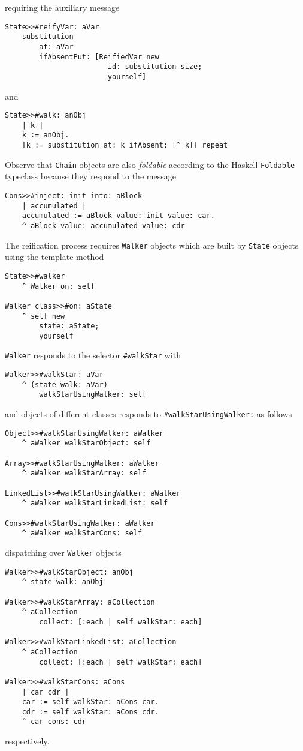 \documentclass[a4paper,11pt]{article}
\begin{document}
requiring the auxiliary message
\begin{verbatim}
State>>#reifyVar: aVar 
    substitution
        at: aVar
        ifAbsentPut: [ReifiedVar new 
                        id: substitution size; 
                        yourself]
\end{verbatim}
and
\begin{verbatim}
State>>#walk: anObj 
    | k |
    k := anObj.
    [k := substitution at: k ifAbsent: [^ k]] repeat
\end{verbatim}
Observe that \Verb|Chain| objects are also \textit{foldable} according to the Haskell \Verb|Foldable| typeclass because 
they respond to the message
\begin{verbatim}
Cons>>#inject: init into: aBlock 
    | accumulated |
    accumulated := aBlock value: init value: car.
    ^ aBlock value: accumulated value: cdr
\end{verbatim}

The reification process requires \Verb|Walker| objects which are built by
\Verb|State| objects using the template method
\begin{verbatim}
State>>#walker
    ^ Walker on: self

Walker class>>#on: aState
    ^ self new
        state: aState;
        yourself
\end{verbatim}
\Verb|Walker| responds to the selector \Verb|#walkStar| with
\begin{verbatim}
Walker>>#walkStar: aVar
    ^ (state walk: aVar)
        walkStarUsingWalker: self
\end{verbatim}
and objects of different classes responds to \Verb|#walkStarUsingWalker:| as follows
\begin{verbatim}
Object>>#walkStarUsingWalker: aWalker
    ^ aWalker walkStarObject: self

Array>>#walkStarUsingWalker: aWalker
    ^ aWalker walkStarArray: self

LinkedList>>#walkStarUsingWalker: aWalker
    ^ aWalker walkStarLinkedList: self

Cons>>#walkStarUsingWalker: aWalker
    ^ aWalker walkStarCons: self
\end{verbatim}
dispatching over \Verb|Walker| objects
\begin{verbatim}
Walker>>#walkStarObject: anObj
    ^ state walk: anObj

Walker>>#walkStarArray: aCollection
    ^ aCollection
        collect: [:each | self walkStar: each]

Walker>>#walkStarLinkedList: aCollection
    ^ aCollection
        collect: [:each | self walkStar: each]

Walker>>#walkStarCons: aCons
    | car cdr |
    car := self walkStar: aCons car.
    cdr := self walkStar: aCons cdr.
    ^ car cons: cdr
\end{verbatim}
respectively.
\end{document}
